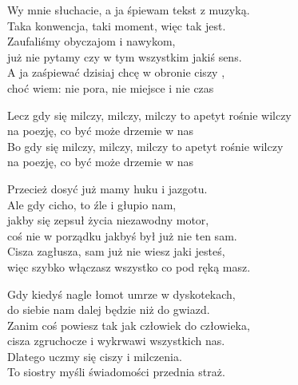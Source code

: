 \begin{text}
    Wy mnie słuchacie, a ja śpiewam tekst z muzyką.\\
    Taka konwencja, taki moment, więc tak jest.\\
    Zaufaliśmy obyczajom i nawykom,\\
    już nie pytamy czy w tym wszystkim jakiś sens.\\
    A ja zaśpiewać dzisiaj chcę w obronie ciszy ,\\
    choć wiem: nie pora, nie miejsce i nie czas

    Lecz gdy się milczy, milczy, milczy to apetyt rośnie wilczy\\
    na poezję, co być może drzemie w nas\\
    Bo gdy się milczy, milczy, milczy to apetyt rośnie wilczy\\
    na poezję, co być może drzemie w nas

    Przecież dosyć już mamy huku i jazgotu.\\
    Ale gdy cicho, to źle i głupio nam,\\
    jakby się zepsuł życia niezawodny motor,\\
    coś nie w porządku jakbyś był już nie ten sam.\\
    Cisza zagłusza, sam już nie wiesz jaki jesteś,\\
    więc szybko włączasz wszystko co pod ręką masz.

    Gdy kiedyś nagle łomot umrze w dyskotekach,\\
    do siebie nam dalej będzie niż do gwiazd.\\
    Zanim coś powiesz tak jak człowiek do człowieka,\\
    cisza zgruchocze i wykrwawi wszystkich nas.\\
    Dlatego uczmy się ciszy i milczenia.\\
    To siostry myśli świadomości przednia straż.
\end{text}
\begin{chord}

\end{chord}
